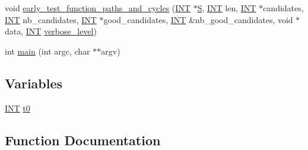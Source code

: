 \begin{DoxyCompactItemize}
void \mbox{\hyperlink{all__cycles_8_c_a9dc326fc68b8e7b14d426fb8ac969a65}{early\+\_\+test\+\_\+function\+\_\+paths\+\_\+and\+\_\+cycles}} (\mbox{\hyperlink{galois_8h_a09fddde158a3a20bd2dcadb609de11dc}{I\+NT}} $\ast$\mbox{\hyperlink{simeon_8_c_adab47f8243f1b5a2c31df2535d6b37d0}{S}}, \mbox{\hyperlink{galois_8h_a09fddde158a3a20bd2dcadb609de11dc}{I\+NT}} len, \mbox{\hyperlink{galois_8h_a09fddde158a3a20bd2dcadb609de11dc}{I\+NT}} $\ast$candidates, \mbox{\hyperlink{galois_8h_a09fddde158a3a20bd2dcadb609de11dc}{I\+NT}} nb\+\_\+candidates, \mbox{\hyperlink{galois_8h_a09fddde158a3a20bd2dcadb609de11dc}{I\+NT}} $\ast$good\+\_\+candidates, \mbox{\hyperlink{galois_8h_a09fddde158a3a20bd2dcadb609de11dc}{I\+NT}} \&nb\+\_\+good\+\_\+candidates, void $\ast$data, \mbox{\hyperlink{galois_8h_a09fddde158a3a20bd2dcadb609de11dc}{I\+NT}} \mbox{\hyperlink{simeon_8_c_a818073fbcc2f439e7c56952f67386122}{verbose\+\_\+level}})
\item 
int \mbox{\hyperlink{all__cycles_8_c_a3c04138a5bfe5d72780bb7e82a18e627}{main}} (int argc, char $\ast$$\ast$argv)
\end{DoxyCompactItemize}
\subsection*{Variables}
\begin{DoxyCompactItemize}
\item 
\mbox{\hyperlink{galois_8h_a09fddde158a3a20bd2dcadb609de11dc}{I\+NT}} \mbox{\hyperlink{all__cycles_8_c_a4268f4fe222ffb119218a0199f5e1904}{t0}}
\end{DoxyCompactItemize}


\subsection{Function Documentation}
\mbox{\label{all__cycles_8_c_a9dc326fc68b8e7b14d426fb8ac969a65}} 
